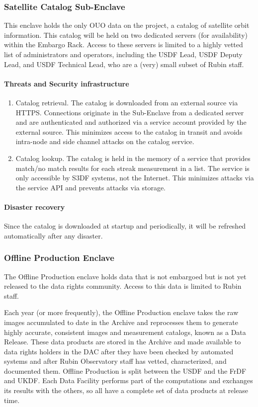 \subsubsection{Satellite Catalog Sub-\gls{Enclave}} \label{sec:satcat}
This enclave holds the only \gls{OUO} data on the project, a catalog of satellite orbit information.
This catalog will be held on two dedicated servers (for availability) within the Embargo Rack.
Access to these servers is limited to a highly vetted list of administrators and operators, including the USDF Lead, USDF Deputy Lead, and USDF Technical Lead, who are a (very) small subset of Rubin staff.

\paragraph{ Threats and Security infrastructure}
\begin{enumerate}
\item Catalog retrieval.  The catalog is downloaded from an external source via HTTPS.  Connections originate in the Sub-Enclave from a dedicated server and are authenticated and authorized via a service account provided by the external source.  This minimizes access to the catalog in transit and avoids intra-node and side channel attacks on the catalog service.
\item Catalog lookup.  The catalog is held in the memory of a service that provides match/no match results for each streak measurement in a list.  The service is only accessible by S3DF systems, not the Internet.  This minimizes attacks via the service API and prevents attacks via storage.
\end{enumerate}

\paragraph{Disaster recovery}
Since the catalog is downloaded at startup and periodically, it will be refreshed automatically after any disaster.

\subsubsection{ Offline Production  \gls{Enclave}}

The Offline Production enclave holds data that is not embargoed but is not yet released to the data rights community.
Access to this data is limited to Rubin staff.

Each year (or more frequently), the Offline Production enclave takes the raw images accumulated to date in the Archive and reprocesses them to generate highly accurate, consistent images and measurement catalogs, known as a Data Release. These data products are stored in the Archive and made available to data rights holders in the DAC after they have been checked by automated systems and after Rubin Observatory staff has vetted, characterized, and documented them. Offline Production is split between the USDF and the \gls{FrDF} and UKDF. Each Data Facility performs part of the computations and exchanges its results with the others, so all have a complete set of data products at release time.


